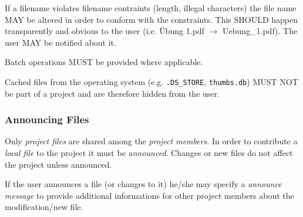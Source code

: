 If a filename violates filename contraints (length, illegal characters) the file name MAY be altered in order to conform with the constraints. This SHOULD happen transparently and obvious to the user (i.e. Übung 1.pdf $\rightarrow$ Uebung\_1.pdf). The user MAY be notified about it.

Batch operations MUST be provided where applicable.

Cached files from the operating system (e.g. \texttt{.DS\_STORE}, \texttt{thumbs.db}) MUST NOT be part of a project and are therefore hidden from the user.


\subsubsection{Announcing Files}
Only \emph{project files} are shared among the \emph{project members}. In order to contribute a \emph{local file} to the project it must be \emph{announced}. 
Changes or new files do not affect the project unless announced. 

If the user announces a file (or changes to it) he/she may specify a \emph{announce message} 
to provide additional informations for other project members about the modification/new file.

